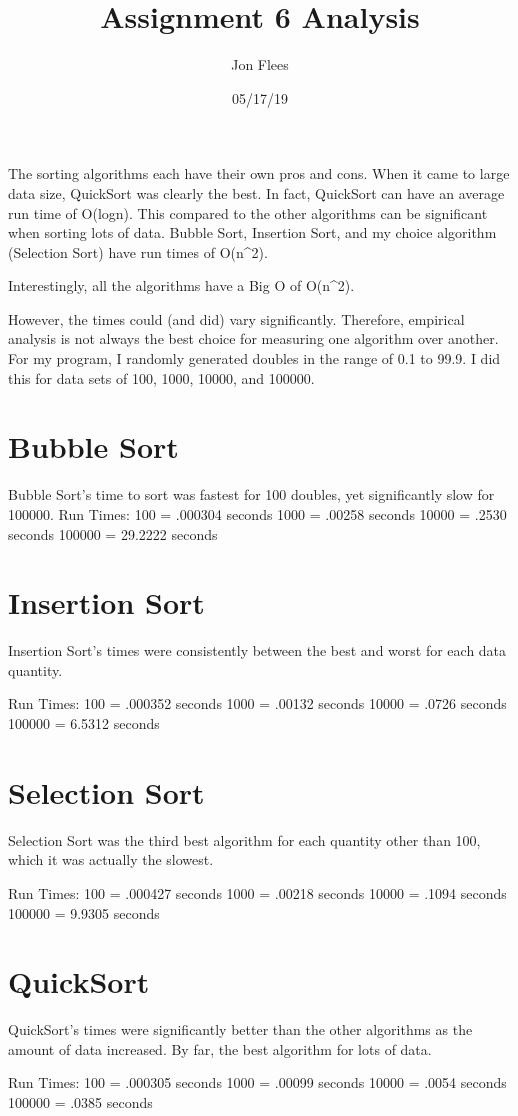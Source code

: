 \documentclass[12pt]{article}
\title{Assignment 6 Analysis}
\author{Jon Flees}
\date{05/17/19}
\begin{document}
\maketitle


The sorting algorithms each have their own pros and cons.
When it came to large data size, QuickSort was clearly the best.
In fact, QuickSort can have an average run time of O(logn).
This compared to the other algorithms can be significant when sorting lots of data.
Bubble Sort, Insertion Sort, and my choice algorithm (Selection Sort) have run times of O(n^2).

Interestingly, all the algorithms have a Big O of O(n^2).

However, the times could (and did) vary significantly.
Therefore, empirical analysis is not always the best choice for measuring one algorithm over another.
For my program, I randomly generated doubles in the range of 0.1 to 99.9.
I did this for data sets of 100, 1000, 10000, and 100000.

\section{Bubble Sort}

Bubble Sort's time to sort was fastest for 100 doubles, yet significantly slow for 100000.
Run Times:
100    = .000304 seconds
1000   = .00258 seconds
10000  = .2530 seconds
100000 = 29.2222 seconds


\section{Insertion Sort}

Insertion Sort's times were consistently between the best and worst for each data quantity.

Run Times:
100    = .000352 seconds
1000   = .00132 seconds
10000  = .0726 seconds
100000 = 6.5312 seconds

\section{Selection Sort}

Selection Sort was the third best algorithm for each quantity other than 100, which it was actually the slowest.

Run Times:
100    = .000427 seconds
1000   = .00218 seconds
10000  = .1094 seconds
100000 = 9.9305 seconds

\section{QuickSort}

QuickSort's times were significantly better than the other algorithms as the amount of data increased. By far, the best algorithm for lots of data.

Run Times:
100    = .000305 seconds
1000   = .00099 seconds
10000  = .0054 seconds
100000 = .0385 seconds
\end{document}
